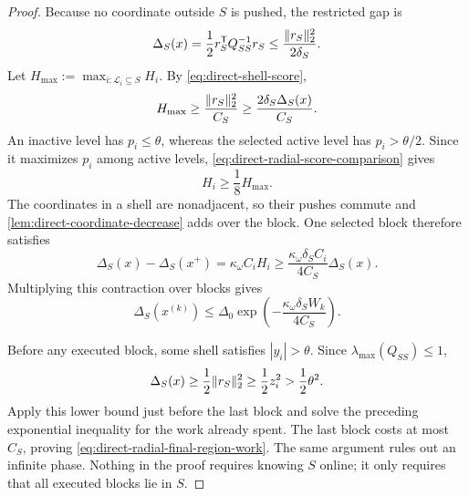 \begin{proof}
Because no coordinate outside $S$ is pushed, the restricted gap is
\begin{equation*}
 \Delta_S(x)=\frac12r_S^\mathsf TQ_{SS}^{-1}r_S
 \leq\frac{\lVert r_S\rVert_2^2}{2\delta_S}.
\end{equation*}
Let $H_{\max}:=\max_{i:\mathcal L_i\subseteq S}H_i$.  By
\cref{eq:direct-shell-score},
\begin{equation*}
 H_{\max}\geq\frac{\lVert r_S\rVert_2^2}{C_S}
 \geq\frac{2\delta_S\Delta_S(x)}{C_S}.
\end{equation*}
An inactive level has $p_i\leq\theta$, whereas the selected active level has
$p_i>\theta/2$.  Since it maximizes $p_i$ among active levels,
\cref{eq:direct-radial-score-comparison} gives
\begin{equation*}
 H_i\geq\frac18H_{\max}.
\end{equation*}
The coordinates in a shell are nonadjacent, so their pushes commute and
\cref{lem:direct-coordinate-decrease} adds over the block.  One selected
block therefore satisfies
\begin{equation*}
 \Delta_S(x)-\Delta_S(x^+)
 =\kappa_\omega C_iH_i
 \geq\frac{\kappa_\omega\delta_SC_i}{4C_S}\Delta_S(x).
\end{equation*}
Multiplying this contraction over blocks gives
\begin{equation*}
 \Delta_S(x^{(k)})
 \leq\Delta_0
 \exp\!\left(-\frac{\kappa_\omega\delta_S W_k}{4C_S}\right).
\end{equation*}

Before any executed block, some shell satisfies $|y_i|>\theta$.  Since
$\lambda_{\max}(Q_{SS})\leq1$,
\begin{equation*}
 \Delta_S(x)
 \geq\frac12\lVert r_S\rVert_2^2
 \geq\frac12z_i^2
 >\frac12\theta^2.
\end{equation*}
Apply this lower bound just before the last block and solve the preceding
exponential inequality for the work already spent.  The last block costs at
most $C_S$, proving \cref{eq:direct-radial-final-region-work}.  The same
argument rules out an infinite phase.  Nothing in the proof requires knowing
$S$ online; it only requires that all executed blocks lie in $S$.
\end{proof}

